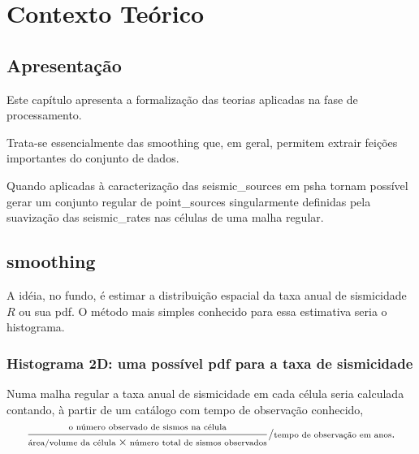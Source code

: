 \chapter{Contexto Teórico}
\label{cap:teoria}


\section{Apresentação}
\label{sec:c04_apresentacao}

Este capítulo apresenta a formalização das teorias aplicadas na fase de
processamento. 

Trata-se essencialmente das \gls{smoothing} que, em geral, permitem extrair 
feições importantes do conjunto de dados.

Quando aplicadas à caracterização das \glspl{seismic_source} em \gls{psha}
tornam possível gerar um conjunto regular de \glspl{point_source} 
singularmente definidas pela suavização das \glspl{seismic_rate} 
nas células de uma malha regular.


\section{\Gls{smoothing}}
\label{sec:04_smoothing_general}

A idéia, no fundo, é estimar a distribuição espacial da taxa anual de sismicidade $R$
ou sua \gls{pdf}.
O método mais simples conhecido para essa estimativa seria o histograma.

\subsection{Histograma 2D: uma possível \glsdesc{pdf} para a taxa de sismicidade}

Numa malha regular a taxa anual de sismicidade em cada célula seria calculada 
contando, à partir de um catálogo com tempo de observação conhecido,
\begin{equation}
\scriptsize
	\ensuremath{
	\frac{\text{o número observado de sismos na célula}}
		 {\text{área/volume da célula} \times 
		  \text{número total de sismos observados}}
	/
	\text{tempo de observação em anos}
	}
\normalsize.
\label{eq:rate_count}
\end{equation}

